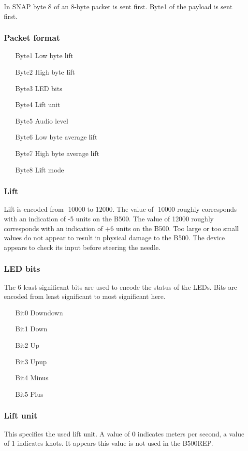 \documentclass{article}
\begin{document}
In SNAP byte 8 of an 8-byte packet is sent first. Byte1 of the payload is sent first.

\subsubsection{Packet format}
\begin{itemize}
\item[Byte1]{Low byte lift}
\item[Byte2]{High byte lift}
\item[Byte3]{LED bits}
\item[Byte4]{Lift unit}
\item[Byte5]{Audio level}
\item[Byte6]{Low byte average lift}
\item[Byte7]{High byte average lift}
\item[Byte8]{Lift mode}
\end{itemize}

\subsubsection{Lift}
Lift is encoded from -10000 to 12000. The value of -10000 roughly corresponds with an indication of -5 units on the B500. The value of 12000 roughly corresponds with an indication of +6 units on the B500. Too large or too small values do not appear to result in physical damage to the B500. The device appears to check its input before steering the needle.

\subsubsection{LED bits}
The 6 least significant bits are used to encode the status of the LEDs. Bits are encoded from least significant to most significant here.


\begin{itemize}
\item[Bit0]{Downdown}
\item[Bit1]{Down}
\item[Bit2]{Up}
\item[Bit3]{Upup}
\item[Bit4]{Minus}
\item[Bit5]{Plus}
\end{itemize}

\subsubsection{Lift unit}
This specifies the used lift unit. A value of 0 indicates meters per second, a value of 1 indicates knots. It appears this value is not used in the B500REP.
\end{document}
